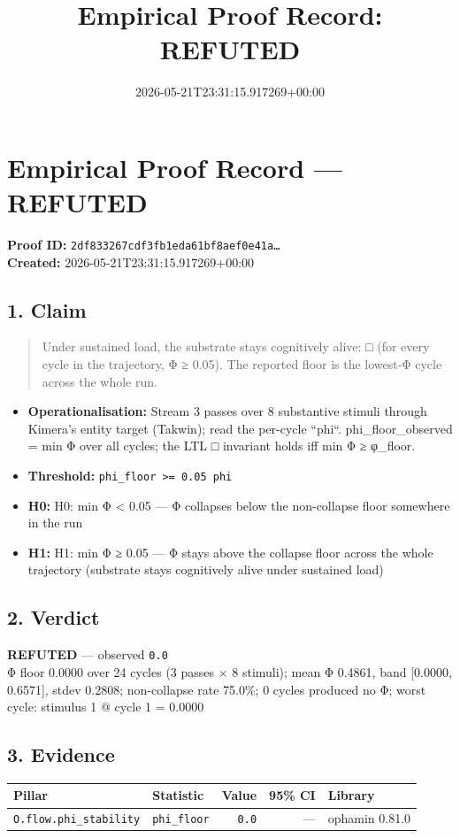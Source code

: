 \documentclass{article}
\title{Empirical Proof Record: REFUTED}
\date{2026-05-21T23:31:15.917269+00:00}
\begin{document}
\maketitle
\section*{Empirical Proof Record --- \textcolor{refuted}{\textbf{REFUTED}}}
\textbf{Proof ID:} \texttt{2df833267cdf3fb1eda61bf8aef0e41a\dots}\\
\textbf{Created:} 2026-05-21T23:31:15.917269+00:00
\subsection*{1. Claim}
\begin{quote}Under sustained load, the substrate stays cognitively alive: □ (for every cycle in the trajectory, Φ ≥ 0.05). The reported floor is the lowest-Φ cycle across the whole run.\end{quote}
\begin{itemize}
\item \textbf{Operationalisation:} Stream 3 passes over 8 substantive stimuli through Kimera's entity target (Takwin); read the per-cycle ``phi``. phi\_floor\_observed = min Φ over all cycles; the LTL □ invariant holds iff min Φ ≥ φ\_floor.
\item \textbf{Threshold:} \texttt{phi\_floor >= 0.05 phi}
\item \textbf{H0:} H0: min Φ < 0.05 — Φ collapses below the non-collapse floor somewhere in the run
\item \textbf{H1:} H1: min Φ ≥ 0.05 — Φ stays above the collapse floor across the whole trajectory (substrate stays cognitively alive under sustained load)
\end{itemize}
\subsection*{2. Verdict}
\textcolor{refuted}{\textbf{REFUTED}} --- observed \texttt{0.0}\\
Φ floor 0.0000 over 24 cycles (3 passes × 8 stimuli); mean Φ 0.4861, band [0.0000, 0.6571], stdev 0.2808; non-collapse rate 75.0\%; 0 cycles produced no Φ; worst cycle: stimulus 1 @ cycle 1 = 0.0000
\subsection*{3. Evidence}
\begin{tabular}{llrrl}\toprule
\textbf{Pillar} & \textbf{Statistic} & \textbf{Value} & \textbf{95\% CI} & \textbf{Library} \\\midrule
\texttt{O.flow.phi\_stability} & \texttt{phi\_floor} & \texttt{0.0} & --- & ophamin 0.81.0 \\
\bottomrule\end{tabular}
\end{document}
